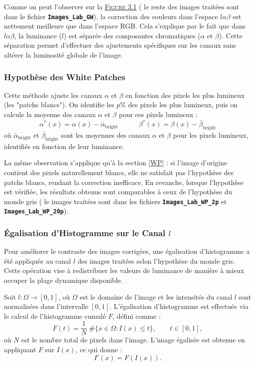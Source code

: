 \documentclass[10pt, a4paper]{extarticle}
\numberwithin{equation}{section}
\numberwithin{figure}{section}
\begin{document}
\par Comme on peut l'observer sur la \hyperref[figure3.1]{\textsc{Figure} 3.1} ( le reste des images traitées sont dans le fichier \colorbox{gray!15}{\texttt{\textbf{Images\_Lab\_GW}}}), la correction des couleurs dans l'espace \( l\alpha\beta \) est nettement meilleure que dans l'espace RGB. Cela s'explique par le fait que dans \( l\alpha\beta \), la luminance (\( l \)) est séparée des composantes chromatiques (\( \alpha \) et \( \beta \)). Cette séparation permet d'effectuer des ajustements spécifiques sur les canaux sans altérer la luminosité globale de l'image.

\subsubsection{Hypothèse des White Patches}  
\par Cette méthode ajuste les canaux \( \alpha \) et \( \beta \) en fonction des pixels les plus lumineux (les "patchs blancs"). On identifie les \( p\% \) des pixels les plus lumineux, puis on calcule la moyenne des canaux \( \alpha \) et \( \beta \) pour ces pixels lumineux :
   \[
   \alpha^*(x) = \alpha(x) - \bar{\alpha}_{\text{bright}} \quad\quad\quad \beta^*(x) = \beta(x) - \bar{\beta}_{\text{bright}}
   \]
   où \( \bar{\alpha}_{\text{bright}} \) et \( \bar{\beta}_{\text{bright}} \) sont les moyennes des canaux \( \alpha \) et \( \beta \) pour les pixels lumineux, identifiés en fonction de leur luminance.
\vspace{2mm}   
\par La même observation s'applique qu'à la section \ref{WP} : si l'image d'origine contient des pixels naturellement blancs, elle ne satisfait pas l'hypothèse des patchs blancs, rendant la correction inefficace. En revanche, lorsque l'hypothèse est vérifiée, les résultats obtenus sont comparables à ceux de l'hypothèse du monde gris ( le images traitées sont dans les fichiers \colorbox{gray!15}{\texttt{\textbf{Images\_Lab\_WP\_2p}}} et \colorbox{gray!15}{\texttt{\textbf{Images\_Lab\_WP\_20p}}}).

\subsubsection{Égalisation d'Histogramme sur le Canal \( l \)}

\par Pour améliorer le contraste des images corrigées, une égalisation d'histogramme a été appliquée au canal \( l \) des images traitées selon l'hypothèse du monde gris. Cette opération vise à redistribuer les valeurs de luminance de manière à mieux occuper la plage dynamique disponible.
\vspace{2mm}
\par Soit \( l : \Omega \to [0, 1] \), où \( \Omega \) est le domaine de l'image et les intensités du canal $l$ sont normalisées dans l'intervalle \([0, 1]\). L'égalisation d'histogramme est effectuée via le calcul de l'histogramme cumulé \( F \), défini comme :
\[
F(t) = \frac{1}{N} \; \# \{x \in \Omega : I(x) \leq t \}, \quad\quad t \in [0, 1],
\]
où \( N \) est le nombre total de pixels dans l'image. L'image égalisée est obtenue en appliquant \( F \) sur \( I(x) \), ce qui donne :
\[
I'(x) = F(I(x)).
\]
\end{document}
